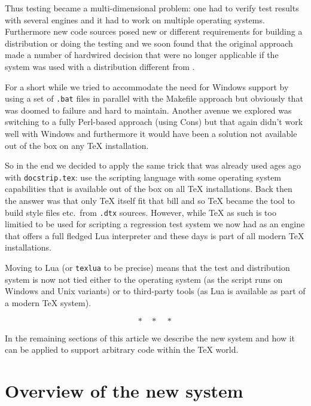 \documentclass[a4paper]{ltugboat}
\begin{document}
Thus testing became a multi-dimensional problem: one had to verify
test results with several engines and it had to work on multiple
operating systems. Furthermore new code sources posed new or different
requirements for building a distribution or doing the testing and
we soon found that the original approach made a number of hardwired
decision that were no longer applicable if the system was used with a
distribution different from \LaTeXe{}.

For a short while we tried to accommodate the need for Windows support
by using a set of \texttt{.bat} files in parallel with the Makefile
approach but obviously that was doomed to failure and hard to
maintain. Another avenue we explored was switching to a fully
Perl-based approach (using Cons) but that again didn't work well with
Windows and furthermore it would have been a solution not available
out of the box on any \TeX{} installation.

So in the end we decided to apply the same trick that was already used
ages ago with \texttt{docstrip.tex}: use the scripting language with
some operating system capabilities that is available out of the box on
all \TeX{} installations. Back then the answer was that only \TeX{} itself
fit that bill and so \TeX{} became the tool to build style files
etc.\ from \texttt{.dtx} sources. However, while \TeX{} as such is too
limitied to be used for scripting a regression test system we now had
\luaTeX{} as an engine that offers a full fledged Lua interpreter\Dash
and these days \luaTeX{} is part of all modern \TeX{} installations.

Moving to Lua (or \texttt{texlua} to be precise) means that the test
and distribution system is now not tied either to the operating system
(as the script runs on Windows and Unix variants) or to third-party
tools (as Lua is available as part of a modern \TeX{} system).

\[
  * \quad * \quad *
\]

In the remaining sections of this article we describe the new system
and how it can be applied to support arbitrary code within the \TeX{}
world.

\section{Overview of the new system}
\label{sec:overview}
\end{document}
